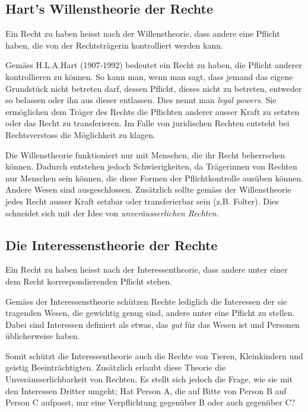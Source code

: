 \documentclass[../main.tex]{subfiles}
\begin{document}
\subsection{Hart's Willenstheorie der Rechte}
\begin{warningbox}
Ein Recht zu haben heisst nach der Willenstheorie, dass andere eine
Pflicht haben, die von der Rechtsträgerin kontrolliert werden kann.	
\end{warningbox}

Gemäss H.L.A.Hart (1907-1992) bedeutet ein Recht zu haben, die Pflicht anderer kontrollieren zu können. So kann man, wenn man sagt, dass jemand das eigene Grundstück nicht betreten darf, dessen Pflicht, dieses nicht zu betreten, entweder so belassen oder ihn aus dieser entlassen. Dies nennt man \textit{legal powers}. Sie ermöglichen dem Träger des Rechts die Pflichten anderer ausser Kraft zu setzten oder das Recht zu transferieren. Im Falle von juridischen Rechten entsteht bei Rechtsverstoss die Möglichkeit zu klagen. 

Die Willenstheorie funktioniert nur mit Menschen, die ihr Recht beherrschen können. Dadurch entstehen jedoch Schwierigkeiten, da Trägerinnen von Rechten nur Menschen sein können, die diese Formen der Pflichtkontrolle ausüben können. Andere Wesen sind ausgeschlossen. Zusätzlich sollte gemäss der Willenstheorie jedes Recht ausser Kraft setzbar oder transferierbar sein (z.B. Folter). Dies schneidet sich mit der Idee von \textit{unveräusserlichen Rechten}.

\subsection{Die Interessenstheorie der Rechte}
\begin{warningbox}
Ein Recht zu haben heisst nach der Interessentheorie, dass andere unter einer dem Recht korrespondierenden Pflicht stehen.	
\end{warningbox}

Gemäss der Interessenstheorie schützen Rechte lediglich die Interessen der sie tragenden Wesen, die gewichtig genug sind, andere unter eine Pflicht zu stellen. Dabei sind Interessen definiert als etwas, das \textit{gut} für das Wesen ist und Personen üblicherweise haben. 

Somit schützt die Interessentheorie auch die Rechte von Tieren, Kleinkindern und geistig Beeinträchtigten. Zusätzlich erlaubt diese Theorie die Unveräusserlichbarkeit von Rechten. Es stellt sich jedoch die Frage, wie sie mit den Interessen Dritter umgeht; Hat Person A, die auf Bitte von Person B auf Person C aufpasst, nur eine Verpflichtung gegenüber B oder auch gegenüber C?

\end{document}
